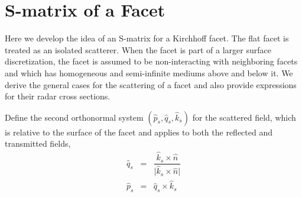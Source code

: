 

\clearpage
\section{S-matrix of a Facet}

Here we develop the idea of an S-matrix for a Kirchhoff facet. The flat facet is treated as an isolated scatterer. When the facet is part of a larger surface discretization, the facet is assumed to be non-interacting with neighboring facets and which has homogeneous and semi-infinite mediums above and below it. We derive the general cases for the scattering of a facet and also provide expressions for their radar cross sections.




Define the second orthonormal system $(\hat{p}_s,\hat{q}_s,\hat{k}_s)$ for the scattered field, which is relative to the surface of the facet and applies to both the reflected and transmitted fields, 
\begin{eqnarray}
\hat{q}_s &=& \dfrac{\hat{k}_s \times \hat{n} }{ \vert \hat{k}_s \times \hat{n} \vert } \\
\hat{p}_s &=& \hat{q}_s \times \hat{k}_s 
\end{eqnarray}

